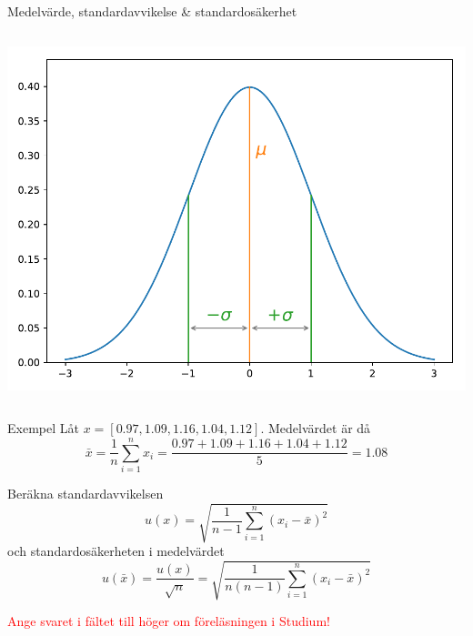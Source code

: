 \documentclass[9pt]{beamer}
\newcommand*\mean[1]{\bar{#1}}
\begin{document}
\begin{frame}{Medelvärde, standardavvikelse \& standardosäkerhet}
\begin{columns}[T]
            \hspace{-0.2\textwidth}\includegraphics[width=1.2\textwidth]{gaus.pdf}
        \end{columns}
        
    \end{frame}

    \begin{frame}[t]{Exempel}
        Låt $x = [0.97, 1.09, 1.16, 1.04, 1.12]$. Medelvärdet är då
        \begin{equation*}
            \bar{x} = \frac{1}{n}\sum\limits_{i=1}^n x_i = \frac{0.97+1.09+1.16+1.04+1.12}{5} = 1.08
        \end{equation*}
        
        Beräkna standardavvikelsen
        \begin{equation*}
            u(x) = \sqrt{\frac1{n-1} \sum\limits_{i=1}^n \left(x_i - \mean{x}\right)^2}
        \end{equation*}
        och standardosäkerheten i medelvärdet
        \begin{equation*}
            u(\mean{x}) = \frac{u(x)}{\sqrt{n}} = \sqrt{\frac1{n(n-1)} \sum_{i=1}^n \left(x_i - \mean{x}\right)^2}
        \end{equation*}
        
        \vspace{0.5cm}
        \begin{center}
            \textcolor{red}{Ange svaret i fältet till höger om föreläsningen i Studium!}    
        \end{center}
        
        
    \end{frame}
    
\end{document}
